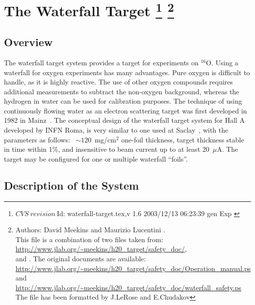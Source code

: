 \chapter[The Waterfall Target]{The Waterfall Target
\footnote{
  $CVS~revision~ $Id: waterfall-target.tex,v 1.6 2003/12/13 06:23:39 gen Exp $ $
}
\footnote{Authors: David Meekins  and 
 Maurizio Lucentini . \\
 This file is a combination of two files taken from: \\
 \url{http://www.jlab.org/~meekins/h20_target/safety_doc/},\\
   and .
  The original documents are available:\\
 \url{http://www.jlab.org/~meekins/h20_target/safety_doc/Operation_manual.ps} and\\
 \url{http://www.jlab.org/~meekins/h20_target/safety_doc/waterfall_safety.ps}\\
 The file has been formatted by J.LeRose 
 and E.Chudakov 
}}

\section{Overview}
\label{sec:wt_overview}

The waterfall target system provides a target for experiments on 
$^{16}$O. Using a waterfall for oxygen experiments has many advantages. Pure 
oxygen is difficult to handle, as it is highly reactive. The use of other 
oxygen compounds requires additional measurements to subtract the non-oxygen 
background, whereas the hydrogen in water can be used for calibration purposes.
The technique of using continuously flowing water as an electron scattering 
target was first developed in 1982 in Mainz~\cite{Voegler:1982}.
The conceptual design of the waterfall target system for Hall A
developed by INFN Roma, 
is very similar to one used at Saclay~\cite{Garibaldi:1992mb},
with the parameters as follows: ~$\sim 120$~mg/cm$^{2}$ one-foil thickness,
target thickness stable in time within 1\%, and insensitive
to beam current up to at least 20~$\mu$A.
The target may be configured for one or multiple waterfall 
``foils''. 


\section{Description of the System}
\label{sec:wt_descrip_sys}

